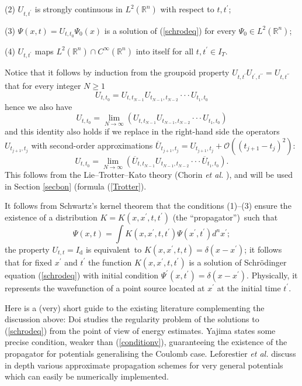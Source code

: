 \documentclass[12pt]{article}%
\begin{document}
(2) $U_{t,t^{\prime}}$ is strongly continuous in $L^{2}(\mathbb{R}^{n})$ with
respect to $t,t^{\prime}$;

(3) $\Psi(x,t)=U_{t,t_{0}}\Psi_{0}(x)$ is a solution of (\ref{schrodeq}) for
every $\Psi_{0}\in L^{2}(\mathbb{R}^{n})$;

(4) $U_{t,t^{\prime}}$ maps $L^{2}(\mathbb{R}^{n})\cap C^{\infty}%
(\mathbb{R}^{n})$ into itself for all $t,t^{\prime}\in I_{T}$.\medskip

Notice that it follows by induction from the groupoid property $U_{t,t^{\prime
}}U_{t^{\prime},t^{\prime\prime}}=U_{t,t^{\prime\prime}}$ that for every
integer $N\geq1$
\begin{equation}
U_{t,t_{0}}=U_{t,t_{N-1}}U_{t_{N-1},t_{N-2}}\cdot\cdot\cdot U_{t_{1},t_{0}}%
\end{equation}
hence we also have
\begin{equation}
U_{t,t_{0}}=\lim_{N\rightarrow\infty}(U_{t,t_{N-1}}U_{t_{N-1},t_{N-2}}%
\cdot\cdot\cdot U_{t_{1},t_{0}})
\end{equation}
and this identity also holds if we replace in the right-hand side the
operators $U_{t_{j+1},t_{j}}$ with second-order approximations $\overline
{U}_{t_{j+1},t_{j}}=U_{t_{j+1},t_{j}}+\mathcal{O}((t_{j+1}-t_{j})^{2})$:%
\begin{equation}
U_{t,t_{0}}=\lim_{N\rightarrow\infty}(\overline{U}_{t,t_{N-1}}U_{t_{N-1}%
,t_{N-2}}\cdot\cdot\cdot\overline{U}_{t_{1},t_{0}}).
\end{equation}
This follows from the Lie--Trotter--Kato theory (Chorin \emph{et al.}
\cite{chorinetal}), and will be used in Section \ref{secbon} (formula
(\ref{Trotter}).

It follows from Schwartz's kernel theorem that the conditions (1)--(3) ensure
the existence of a distribution $K=K(x,x^{\prime},t,t^{\prime})$ (the
\textquotedblleft propagator\textquotedblright)\ such that
\[
\Psi(x,t)=\int K(x,x^{\prime},t,t^{\prime})\Psi(x^{\prime},t^{\prime}%
)d^{n}x^{\prime};
\]
the property $U_{t,t}=I_{\mathrm{d}}$ is equivalent\ to $K(x,x^{\prime
},t,t)=\delta(x-x^{\prime})$; it follows that for fixed $x^{\prime}$ and
$t^{\prime}$ the function $K(x,x^{\prime},t,t^{\prime})$ is a solution of
Schr\"{o}dinger equation (\ref{schrodeq}) with initial condition $\Psi
^{\prime}(x,t^{\prime})=\delta(x-x^{\prime})$. Physically, it represents the
wavefunction of a point source located at $x^{\prime}$ at the initial time
$t^{\prime}$.

Here is a (very) short guide to the existing literature complementing the
discussion above: Doi \cite{doi} studies the regularity problem of the
solutions to (\ref{schrodeq}) from the point of view of energy estimates.
Yajima \cite{ya87} states some precise condition, weaker than
(\ref{conditionv}), guaranteeing the existence of the propagator for
potentials generalising the Coulomb case. Leforestier \emph{et al.} \cite{num}
discuss in depth various approximate propagation schemes for very general
potentials which can easily be numerically implemented.
\end{document}
